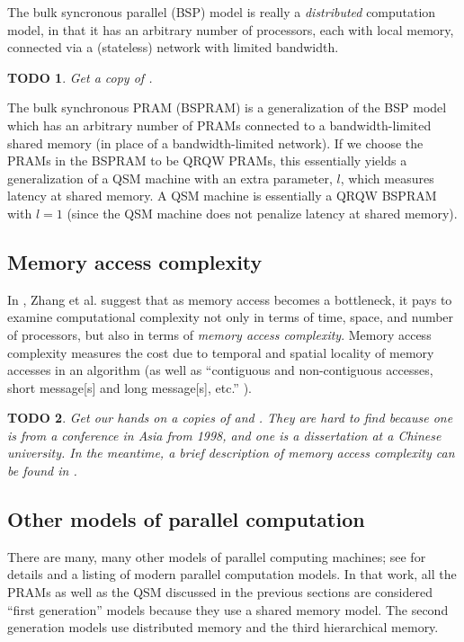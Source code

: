 \documentclass{article}
\newtheorem{todo}{TODO}
\begin{document}
The bulk syncronous parallel (BSP) \cite{valiant89} model is really a \emph{distributed} computation model, in that it has an arbitrary number of processors, each with local memory, connected via a (stateless) network with limited bandwidth.

\begin{todo}
  Get a copy of \cite{valiant89}.
\end{todo}

The bulk synchronous PRAM (BSPRAM) \cite{tiskin98} is a generalization of the BSP model which has an arbitrary number of PRAMs connected to a bandwidth-limited shared memory (in place of a bandwidth-limited network).
If we choose the PRAMs in the BSPRAM to be QRQW PRAMs, this essentially yields a generalization of a QSM machine with an extra parameter, $l$, which measures latency at shared memory.
A QSM machine is essentially a QRQW BSPRAM with $l=1$ (since the QSM machine does not penalize latency at shared memory).

\subsection{Memory access complexity}

In \cite{zstc98, zhang00}, Zhang et al. suggest that as memory access becomes a bottleneck, it pays to examine computational complexity not only in terms of time, space, and number of processors, but also in terms of \emph{memory access complexity}.
Memory access complexity measures the cost due to temporal and spatial locality of memory accesses in an algorithm (as well as ``contiguous and non-contiguous accesses, short message[s] and long message[s], etc.'' \cite{zcsm07}).

\begin{todo}
  Get our hands on a copies of \cite{zstc98} and \cite{zhang00}.
  They are hard to find because one is from a conference in Asia from 1998, and one is a dissertation at a Chinese university.
  In the meantime, a brief description of memory access complexity can be found in \cite[Section~4.3]{zcsm07}.
\end{todo}

\subsection{Other models of parallel computation}

There are many, many other models of parallel computing machines; see \cite{zcsm07} for details and a listing of modern parallel computation models.
In that work, all the PRAMs as well as the QSM discussed in the previous sections are considered ``first generation'' models because they use a shared memory model.
The second generation models use distributed memory and the third hierarchical memory.
\end{document}
